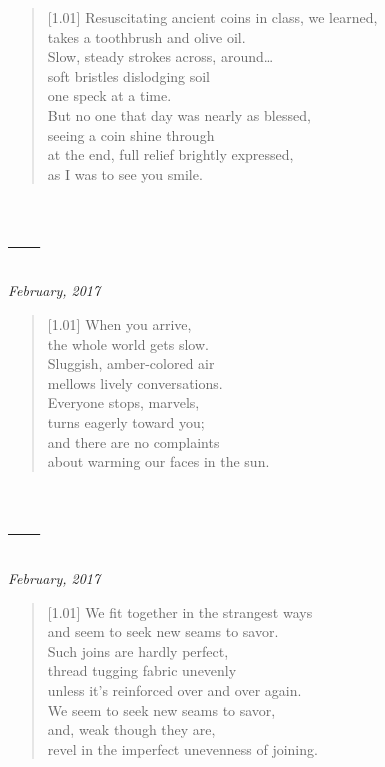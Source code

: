 \begin{verse}[1.01\textwidth]
  Resuscitating ancient coins in class, we learned,\\
  takes a toothbrush and olive oil.\\
  Slow, steady strokes across, around\ldots{}\\
  soft bristles dislodging soil\\
  one speck at a time.\\
  But no one that day was nearly as blessed,\\
  seeing a coin shine through\\
  at the end, full relief brightly expressed,\\
  as I was to see you smile.
\end{verse}
\newpage

\section*{---}

\hfill\textit{February, 2017}

\begin{verse}[1.01\textwidth]
  When you arrive,\\
  the whole world gets slow.\\
  Sluggish, amber-colored air\\
  mellows lively conversations.\\
  Everyone stops, marvels,\\
  turns eagerly toward you;\\
  and there are no complaints\\
  about warming our faces in the sun.
\end{verse}
\newpage

\section*{---}

\hfill\textit{February, 2017}

\begin{verse}[1.01\textwidth]
  We fit together in the strangest ways\\
  and seem to seek new seams to savor.\\
  Such joins are hardly perfect,\\
  thread tugging fabric unevenly\\
  unless it's reinforced over and over again.\\
  We seem to seek new seams to savor,\\
  and, weak though they are,\\
  revel in the imperfect unevenness of joining.
\end{verse}
\newpage

